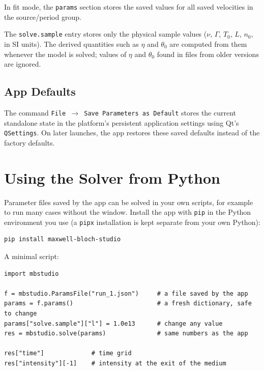 \documentclass[12pt,a4paper]{article}
\newcommand{\menu}[1]{\texttt{#1}}
\begin{document}
In fit mode, the \texttt{params} section stores the saved values for all saved velocities in the source/period group.

The \texttt{solve.sample} entry stores only the physical sample values
($\nu$, $\Gamma$, $T_0$, $L$, $n_0$, in SI units). The derived quantities such as
$\eta$ and $\theta_0$ are computed from them whenever the model is solved; values
of $\eta$ and $\theta_0$ found in files from older versions are ignored.

\subsection{App Defaults}

The command \menu{File $\to$ Save Parameters as Default} stores the current standalone state in the platform's
persistent application settings using Qt's \texttt{QSettings}. On later launches, the app restores these saved defaults
instead of the factory defaults.

\section{Using the Solver from Python}\label{sec:python}

Parameter files saved by the app can be solved in your own scripts, for example
to run many cases without the window. Install the app with \texttt{pip} in the
Python environment you use (a \texttt{pipx} installation is kept separate from
your own Python):
\begin{verbatim}
pip install maxwell-bloch-studio
\end{verbatim}

A minimal script:
\begin{verbatim}
import mbstudio

f = mbstudio.ParamsFile("run_1.json")     # a file saved by the app
params = f.params()                       # a fresh dictionary, safe to change
params["solve.sample"]["l"] = 1.0e13      # change any value
res = mbstudio.solve(params)              # same numbers as the app

res["time"]             # time grid
res["intensity"][-1]    # intensity at the exit of the medium
\end{verbatim}
\end{document}
